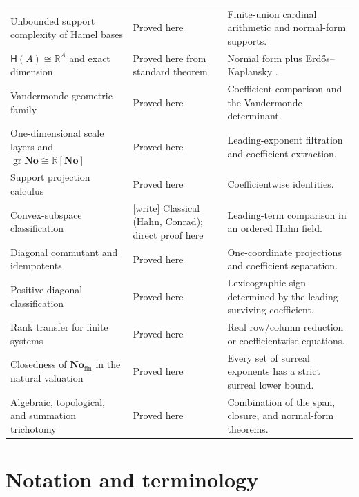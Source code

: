 \documentclass[11pt,letterpaper]{article}
\numberwithin{equation}{section}
\theoremstyle{definition}
\theoremstyle{remark}
\newcommand{\No}{\mathbf{No}}
\newcommand{\R}{\mathbb{R}}
\newcommand{\Hahn}{\mathsf{H}}
\newcommand{\Fin}{\No_{\mathrm{fin}}}
\newcommand{\gr}{\operatorname{gr}}
\newcommand{\wtag}{\textup{[write]}}%
\begin{document}
\begin{longtable}{>{\raggedright\arraybackslash}p{}
                  >{\raggedright\arraybackslash}p{}
                  >{\raggedright\arraybackslash}p{}}
Unbounded support complexity of Hamel bases & Proved here
& Finite-union cardinal arithmetic and normal-form supports.\\[0.3em]

$\Hahn(A)\cong\R^A$ and exact dimension & Proved here from standard theorem
& Normal form plus Erd\H{o}s--Kaplansky \cite{Kuba}.\\[0.3em]

Vandermonde geometric family & Proved here
& Coefficient comparison and the Vandermonde determinant.\\[0.3em]

One-dimensional scale layers and $\gr\No\cong\R[\No]$ & Proved here
& Leading-exponent filtration and coefficient extraction.\\[0.3em]

Support projection calculus & Proved here
& Coefficientwise identities.\\[0.3em]

Convex-subspace classification & \wtag{} Classical (Hahn, Conrad); direct proof here
& Leading-term comparison in an ordered Hahn field.\\[0.3em]

Diagonal commutant and idempotents & Proved here
& One-coordinate projections and coefficient separation.\\[0.3em]

Positive diagonal classification & Proved here
& Lexicographic sign determined by the leading surviving coefficient.\\[0.3em]

Rank transfer for finite systems & Proved here
& Real row/column reduction or coefficientwise equations.\\[0.3em]

Closedness of $\Fin$ in the natural valuation & Proved here
& Every set of surreal exponents has a strict surreal lower bound.\\[0.3em]

Algebraic, topological, and summation trichotomy & Proved here
& Combination of the span, closure, and normal-form theorems.\\
\bottomrule
\end{longtable}

\section{Notation and terminology}\label{rvs:app:notation}\label{rvs:cv:app:notation}
\end{document}

